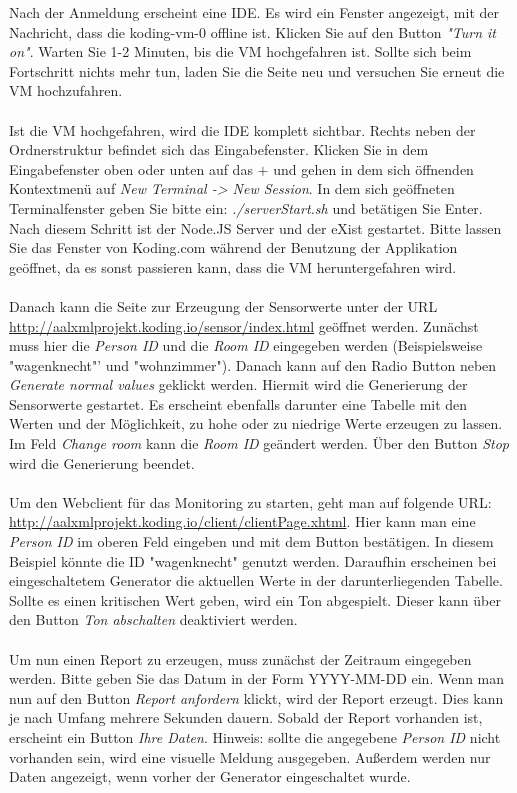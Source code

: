 Nach der Anmeldung erscheint eine IDE. Es wird ein Fenster angezeigt, mit der Nachricht, dass die koding-vm-0 offline ist. Klicken Sie auf den Button \textit{"Turn it on"}. Warten Sie 1-2 Minuten, bis die VM hochgefahren ist. Sollte sich beim Fortschritt nichts mehr tun, laden Sie die Seite neu und versuchen Sie erneut die VM hochzufahren.
\\
\\
Ist die VM hochgefahren, wird die IDE komplett sichtbar. Rechts neben der Ordnerstruktur befindet sich das Eingabefenster. Klicken Sie in dem Eingabefenster oben oder unten auf das $+$ und gehen in dem sich öffnenden Kontextmenü auf \textit{New Terminal -> New Session}. In dem sich geöffneten Terminalfenster geben Sie bitte ein: \textit{./serverStart.sh} und betätigen Sie Enter. Nach diesem Schritt ist der Node.JS Server und der eXist gestartet. Bitte lassen Sie das Fenster von Koding.com während der Benutzung der Applikation geöffnet, da es sonst passieren kann, dass die VM heruntergefahren wird.
\\
\\
Danach kann die Seite zur Erzeugung der Sensorwerte unter der URL \url{http://aalxmlprojekt.koding.io/sensor/index.html} geöffnet werden. Zunächst muss hier die \textit{Person ID} und die \textit{Room ID} eingegeben werden (Beispielsweise "wagenknecht"'  und "wohnzimmer"). Danach kann auf den Radio Button neben \textit{Generate normal values} geklickt werden. Hiermit wird die Generierung der Sensorwerte gestartet. Es erscheint ebenfalls darunter eine Tabelle mit den Werten und der Möglichkeit, zu hohe oder zu niedrige Werte erzeugen zu lassen. Im Feld \textit{Change room} kann die \textit{Room ID} geändert werden. Über den Button \textit{Stop} wird die Generierung beendet.
\\
\\
Um den Webclient für das Monitoring zu starten, geht man auf folgende URL: \url{http://aalxmlprojekt.koding.io/client/clientPage.xhtml}. Hier kann man eine \textit{Person ID} im oberen Feld eingeben und mit dem Button bestätigen. In diesem Beispiel könnte die ID "wagenknecht" genutzt werden. Daraufhin erscheinen bei eingeschaltetem Generator die aktuellen Werte in der darunterliegenden Tabelle. Sollte es einen kritischen Wert geben, wird ein Ton abgespielt. Dieser kann über den Button \textit{Ton abschalten} deaktiviert werden. 
\\
\\
Um nun einen Report zu erzeugen, muss zunächst der Zeitraum eingegeben werden. Bitte geben Sie das Datum in der Form YYYY-MM-DD ein. Wenn man nun auf den Button \textit{Report anfordern} klickt, wird der Report erzeugt. Dies kann je nach Umfang mehrere Sekunden dauern. Sobald der Report vorhanden ist, erscheint ein Button \textit{Ihre Daten}. Hinweis: sollte die angegebene \textit{Person ID} nicht vorhanden sein, wird eine visuelle Meldung ausgegeben. Außerdem werden nur Daten angezeigt, wenn vorher der Generator eingeschaltet wurde.

